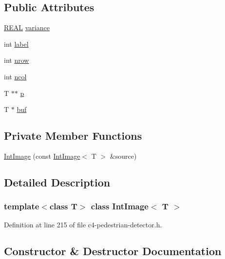 \subsection*{Public Attributes}
\begin{DoxyCompactItemize}
\item 
\mbox{\hyperlink{c4-pedestrian-detector_8h_a5821460e95a0800cf9f24c38915cbbde}{R\+E\+AL}} \mbox{\hyperlink{class_int_image_a2da0267dc732e9e4149e70a05f744fb6}{variance}}
\item 
int \mbox{\hyperlink{class_int_image_aeeeaa5da82f21cdc95ab3f941aa405e7}{label}}
\item 
int \mbox{\hyperlink{class_array2d_c_a12f690f7195f7674a86a7e1eedbc473c}{nrow}}
\item 
int \mbox{\hyperlink{class_array2d_c_a27e0f8f40f644831cd7c750db59dc28a}{ncol}}
\item 
T $\ast$$\ast$ \mbox{\hyperlink{class_array2d_c_a727eae5d663d463635cc150e6f771f0d}{p}}
\item 
T $\ast$ \mbox{\hyperlink{class_array2d_c_a25d8fa5049d4c7ded126e0acdd18f37a}{buf}}
\end{DoxyCompactItemize}
\subsection*{Private Member Functions}
\begin{DoxyCompactItemize}
\item 
\mbox{\hyperlink{class_int_image_ad5d40c163fb0768b5e73a8efc4a6084c}{Int\+Image}} (const \mbox{\hyperlink{class_int_image}{Int\+Image}}$<$ T $>$ \&source)
\end{DoxyCompactItemize}


\subsection{Detailed Description}
\subsubsection*{template$<$class T$>$\newline
class Int\+Image$<$ T $>$}



Definition at line 215 of file c4-\/pedestrian-\/detector.\+h.



\subsection{Constructor \& Destructor Documentation}
\mbox{\label{class_int_image_ad5d40c163fb0768b5e73a8efc4a6084c}} 
